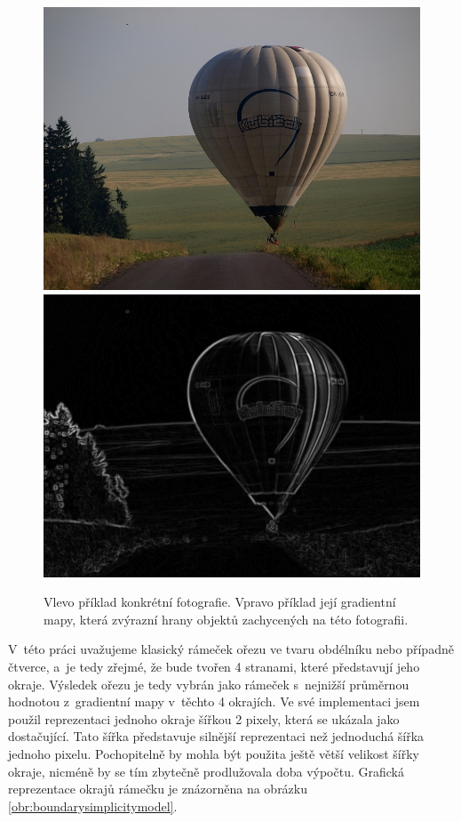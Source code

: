 \begin{figure}[H]
  \centering
  \includegraphics[scale=1.0]{obrazky/ORIGbalon.jpg} \qquad
  \includegraphics[scale=1.0]{obrazky/gradientbalon.jpg}
  \caption{Vlevo příklad konkrétní fotografie. Vpravo příklad její gradientní mapy, která zvýrazní hrany objektů zachycených na této fotografii.}
  \label{obr:gradient}
\end{figure}

V~této práci uvažujeme klasický rámeček ořezu ve tvaru obdélníku nebo případně čtverce, a~je tedy zřejmé, že bude tvořen 4 stranami, které představují jeho okraje. Výsledek ořezu je tedy vybrán jako rámeček s~nejnižší průměrnou hodnotou z~gradientní mapy v~těchto 4 okrajích. Ve své implementaci jsem použil reprezentaci jednoho okraje šířkou 2 pixely, která se ukázala jako dostačující. Tato šířka představuje silnější reprezentaci než jednoduchá šířka jednoho pixelu. Pochopitelně by mohla být použita ještě větší velikost šířky okraje, nicméně by se tím zbytečně prodlužovala doba výpočtu. Grafická reprezentace okrajů rámečku je znázorněna na obrázku \ref{obr:boundarysimplicitymodel}.


